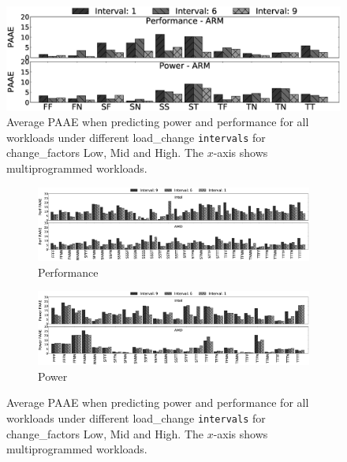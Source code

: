 \begin{figure}[t]
    \centering
    \includegraphics[width=\textwidth]{Chapter3/Figs/changefactor/summary-arm.eps}
    \caption[Average PAAE on ARM under different load\_change intervals]{ Average PAAE when predicting power and performance for all workloads under different load\_change \texttt{intervals} for change\_factors Low, Mid and High. The $x$-axis shows multiprogrammed workloads.}
    \label{fig: armpowerperf}
\end{figure}

\begin{figure}[htb!]
   \centering
    \begin{subfigure}{\textwidth}
        \centering
        \includegraphics[width=\textwidth]{Chapter3/Figs/changefactor/summary_perf_intel_amd.eps}
        \caption{Performance}
        \label{fig: perfintelamd}
    \end{subfigure}
    \begin{subfigure}{\textwidth}
        \centering
        \includegraphics[width=\textwidth]{Chapter3/Figs/changefactor/summary_power_intel_amd.eps}
        \caption{Power}
        \label{fig: powerintelamd}
    \end{subfigure}
    \caption[Average PAAE on Intel and AMD under different load\_change intervals]{ Average PAAE when predicting power and performance for all workloads under different load\_change \texttt{intervals} for change\_factors Low, Mid and High. The $x$-axis shows multiprogrammed workloads.}
    \label{fig: REPPH interval}
\end{figure}


